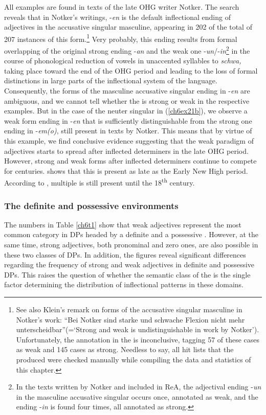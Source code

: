 \documentclass[output=paper,colorlinks,citecolor=brown]{langscibook}
\begin{document}
All examples are found in texts of the late OHG writer Notker. The
 search reveals that in Notker's writings, -\emph{en} is the
default inflectional ending of adjectives in the accusative singular
masculine, appearing in 202 of the total of 207 instances of this
form.\footnote{See also Klein's \citeyearpar[291]{klein2007semantischen} remark on forms of the
  accusative singular masculine in Notker's work: ``Bei Notker sind
  starke und schwache Flexion nicht mehr unterscheidbar''(=`Strong and
  weak  is undistinguishable in work by Notker').
  Unfortunately, the annotation in the  is inconclusive, tagging
  57 of these cases as weak and 145 cases as strong. Needless to say,
  all hit lists that the  produced were checked manually while
  compiling the data and statistics of this chapter.} Very probably,
this ending results from formal overlapping of the original strong
ending -\emph{an} and the weak one -\emph{un}/-\emph{in}\footnote{In the
  texts written by Notker and included in ReA, the adjectival ending
  -\emph{un} in the masculine accusative singular occurs once, annotated
  as weak, and the ending -\emph{in} is found four times, all annotated as
  strong.} in the course of phonological reduction of vowels in
unaccented syllables to \emph{schwa,} taking place toward the end of the
OHG period and leading to the loss of formal distinctions in large parts
of the inflectional system of the language. Consequently, the forms of
the masculine accusative singular ending in -\emph{en} are ambiguous,
and we cannot tell whether the  is strong or weak
in the respective examples. But in the case of the neuter  singular in (\ref{ch6ex21b}), we observe a weak form ending in -\emph{en} that is
sufficiently distinguishable from the strong one ending in
-\emph{em(o)}, still present in texts by Notker. This means that
by virtue of this example, we find conclusive evidence suggesting that
the weak paradigm of adjectives starts to spread after inflected
 determiners in the late OHG period. However, strong and weak
forms after inflected  determiners continue to compete for
centuries. \citet{Demske01} shows that this  is present as late as 
the Early New High  period. According to \citet{Sahel2022}, multiple  is still present until the 18\textsuperscript{th} century.

\subsubsection{The definite and possessive environments}\label{sewc:defposs}
The numbers in Table \ref{ch6t1} show that weak adjectives represent the most
common category in DPs headed by a definite and a possessive .
However, at the same time, strong adjectives, both pronominal and zero ones,
are also possible in these two classes of DPs. In addition, the figures reveal
significant differences regarding the frequency of strong and weak
adjectives in definite and possessive DPs. This raises the question of
whether the semantic class of the  is the single factor
determining the distribution of inflectional patterns in these domains.
\end{document}
